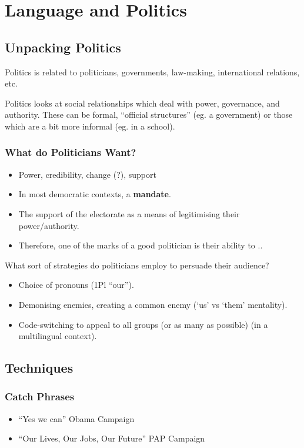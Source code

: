 \documentclass[../main.tex]{subfiles}
\begin{document}
	\chapter{Language and Politics}
		\section{Unpacking Politics}
			Politics is related to politicians, governments, law-making, international relations, etc. \par
			Politics looks at social relationships which deal with power, governance, and authority. These can be formal, ``official structures'' (eg. a government) or those which are a bit more informal (eg. in a school).

			\subsection{What do Politicians Want?}
				\begin{itemize}
					\item Power, credibility, change (?), support
					\item In most democratic contexts, a \textbf{mandate}.
					\item The support of the electorate as a means of legitimising their power/authority.
					\item Therefore, one of the marks of a good politician is their ability to ..
				\end{itemize}

				What sort of strategies do politicians employ to persuade their audience?
					\begin{itemize}
						\item Choice of pronouns (1Pl ``our'').
						\item Demonising enemies, creating a common enemy (`us' vs `them' mentality).
						\item Code-switching to appeal to all groups (or as many as possible) (in a multilingual context).
					\end{itemize}
		
		\section{Techniques}
			\subsection{Catch Phrases}
				\begin{itemize}
					\item ``Yes we can'' Obama Campaign
					\item ``Our Lives, Our Jobs, Our Future'' PAP Campaign
				\end{itemize}
				
\end{document}
